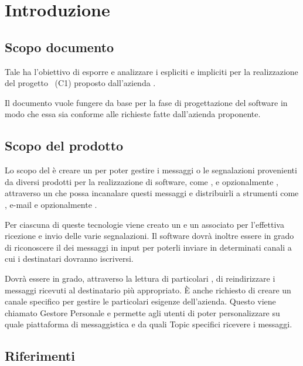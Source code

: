 \newpage
\section{Introduzione}

	\subsection{Scopo documento}
	Tale  ha l'obiettivo di esporre e analizzare i  espliciti e impliciti per la realizzazione del progetto \progetto\ (C1) proposto dall'azienda \II.

	Il documento vuole fungere da base per la fase di progettazione del software in modo che essa sia conforme alle richieste fatte dall'azienda proponente.

    
    \subsection{Scopo del prodotto}
	Lo scopo del  è creare un  per poter gestire i messaggi o le segnalazioni provenienti da diversi prodotti per la realizzazione di software, come ,  e opzionalmente , attraverso un  che possa incanalare questi messaggi e distribuirli a strumenti come	, e-mail e opzionalmente .\par
	Per ciascuna di queste tecnologie viene creato un  e un  associato per l'effettiva ricezione e invio delle varie segnalazioni.
	Il software dovrà inoltre essere in grado di riconoscere il  dei messaggi in input per poterli inviare in determinati canali a cui i
	destinatari dovranno iscriversi.\par
	Dovrà essere in grado, attraverso la lettura di	particolari	, di reindirizzare i messaggi ricevuti al destinatario più appropriato. 
	\`E anche richiesto di creare un canale specifico per gestire le particolari esigenze dell'azienda. 
	Questo viene chiamato Gestore Personale e permette agli utenti di poter personalizzare su quale piattaforma di messaggistica e da quali Topic specifici ricevere i messaggi.
	
	


    

	\subsection{Riferimenti}

